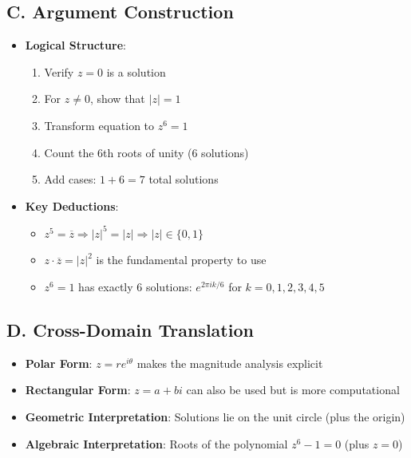 \documentclass[11pt]{article}
\begin{document}
\begin{strategybox}
\subsection*{C. Argument Construction}
\begin{itemize}[leftmargin=*]
    \item \textbf{Logical Structure}:
    \begin{enumerate}
        \item Verify $z = 0$ is a solution
        \item For $z \neq 0$, show that $|z| = 1$
        \item Transform equation to $z^6 = 1$
        \item Count the 6th roots of unity (6 solutions)
        \item Add cases: $1 + 6 = 7$ total solutions
    \end{enumerate}
    \item \textbf{Key Deductions}:
    \begin{itemize}
        \item $z^5 = \overline{z} \Rightarrow |z|^5 = |z| \Rightarrow |z| \in \{0, 1\}$
        \item $z \cdot \overline{z} = |z|^2$ is the fundamental property to use
        \item $z^6 = 1$ has exactly 6 solutions: $e^{2\pi i k/6}$ for $k = 0, 1, 2, 3, 4, 5$
    \end{itemize}
\end{itemize}

\subsection*{D. Cross-Domain Translation}
\begin{itemize}[leftmargin=*]
    \item \textbf{Polar Form}: $z = re^{i\theta}$ makes the magnitude analysis explicit
    \item \textbf{Rectangular Form}: $z = a + bi$ can also be used but is more computational
    \item \textbf{Geometric Interpretation}: Solutions lie on the unit circle (plus the origin)
    \item \textbf{Algebraic Interpretation}: Roots of the polynomial $z^6 - 1 = 0$ (plus $z = 0$)
\end{itemize}
\end{strategybox}
\end{document}
